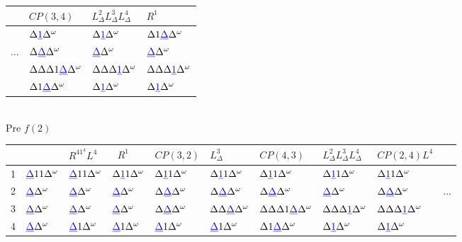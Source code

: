 \documentclass[11pt,a4paper]{article}
\newcommand{\blue}[1]{\textcolor{blue}{#1}}
\newcommand{\D}{\Delta}
\newcommand{\EOT}{\Delta^\omega} %
\newcommand{\UL}[1]{\blue{\underbar{$#1$}}} %
\begin{document}
\begin{flushright}
  \begin{tabular}{r|l|l|l}
        &\tiny{$CP(3,4)$}          & \tiny{$L^2_\D L^3_\D L^4_\D$} & \tiny{$R^1$}           \\\hline
        &$\D \UL{1} \EOT$          & $\D \UL{1} \EOT$              & $\D 1 \UL{\D} \EOT$    \\
    ... &$\D \UL{\D} \EOT$         & $\UL{\D} \EOT$                & $\UL{\D} \EOT$         \\
        &$\D \D \D 1 \UL{\D} \EOT$ & $\D \D \D \UL{1} \EOT$        & $\D \D \D \UL{1} \EOT$ \\
        &$\D 1 \UL{\D} \EOT$       & $\D \UL{1} \EOT$              & $\D \UL{1} \EOT$       \\
  \end{tabular}
\end{flushright}

\hfill\\[-1em]

Pre $f(2)$\\[-0.5em]

\begin{tabular}{r|l|l|l|l|l|l|l|l|l}
    &                    & \tiny{$R^41^4L^4$} & \tiny{$R^1$}       & \tiny{$CP(3,2)$}   & \tiny{$L^3_\D$}      & \tiny{$CP(4,3)$}          &\tiny{$L^2_\D L^3_\D L^4_\D$}& \tiny{$CP(2,4)L^4$}    & \\\hline
  1 & $\UL{\D} 1 1 \EOT$ & $\UL{\D} 1 1 \EOT$ & $\D \UL{1} 1 \EOT$ & $\D \UL{1} 1 \EOT$ & $\D \UL{1} 1 \EOT$   & $\D \UL{1} 1 \EOT$        & $\D \UL{1} 1 \EOT$          & $\D \UL{1} 1 \EOT$     & \\
  2 & $\UL{\D} \EOT$     & $\UL{\D} \EOT$     & $\UL{\D} \EOT$     & $\D \UL{\D} \EOT$  & $\D \UL{\D} \EOT$    & $\D \UL{\D} \EOT$         & $\UL{\D} \EOT$              & $\D \UL{\D} \EOT$      & ... \\
  3 & $\UL{\D} \EOT$     & $\UL{\D} \EOT$     & $\UL{\D} \EOT$     & $\D \UL{\D} \EOT$  & $\D \D \UL{\D} \EOT$ & $\D \D \D 1 \UL{\D} \EOT$ & $\D \D \D \UL{1} \EOT$      & $\D \D \D \UL{1} \EOT$ & \\
  4 & $\UL{\D} \EOT$     & $\UL{\D} 1 \EOT$   & $\UL{\D} 1 \EOT$   & $\UL{\D} 1 \EOT$   & $\UL{\D} 1 \EOT$     & $\D 1 \UL{\D} \EOT$       & $\D \UL{1} \EOT$            & $\D \UL{1} \EOT$       & \\
\end{tabular}
\end{document}
